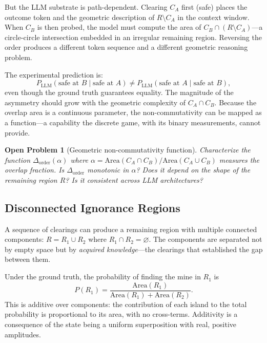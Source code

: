 \documentclass[12pt,a4paper]{article}
\newtheorem{openproblem}[theorem]{Open Problem}
\theoremstyle{definition}
\theoremstyle{remark}
\newcommand{\Area}{\mathrm{Area}}
\begin{document}
But the LLM substrate is path-dependent.  Clearing $C_A$ first (safe) places the outcome token and the geometric description of $R \setminus C_A$ in the context window.  When $C_B$ is then probed, the model must compute the area of $C_B \cap (R \setminus C_A)$---a circle-circle intersection embedded in an irregular remaining region.  Reversing the order produces a different token sequence and a different geometric reasoning problem.

The experimental prediction is:
\begin{equation}\label{eq:order-dependence}
  P_{\text{LLM}}(\text{safe at } B \mid \text{safe at } A) \neq P_{\text{LLM}}(\text{safe at } A \mid \text{safe at } B),
\end{equation}
even though the ground truth guarantees equality.  The magnitude of the asymmetry should grow with the geometric complexity of $C_A \cap C_B$.  Because the overlap area is a continuous parameter, the non-commutativity can be mapped as a function---a capability the discrete game, with its binary measurements, cannot provide.

\begin{openproblem}[Geometric non-commutativity function]
\label{op:noncommute}
Characterize the function $\Delta_{\text{order}}(\alpha)$ where $\alpha = \Area(C_A \cap C_B) / \Area(C_A \cup C_B)$ measures the overlap fraction.  Is $\Delta_{\text{order}}$ monotonic in $\alpha$?  Does it depend on the shape of the remaining region $R$?  Is it consistent across LLM architectures?
\end{openproblem}

\subsection{Disconnected Ignorance Regions}
\label{sec:disconnected}

A sequence of clearings can produce a remaining region with multiple connected components: $R = R_1 \cup R_2$ where $R_1 \cap R_2 = \varnothing$.  The components are separated not by empty space but by \emph{acquired knowledge}---the clearings that established the gap between them.

Under the ground truth, the probability of finding the mine in $R_1$ is
\begin{equation}\label{eq:additivity}
  P(R_1) = \frac{\Area(R_1)}{\Area(R_1) + \Area(R_2)}.
\end{equation}
This is additive over components: the contribution of each island to the total probability is proportional to its area, with no cross-terms.  Additivity is a consequence of the state being a uniform superposition with real, positive amplitudes.
\end{document}
